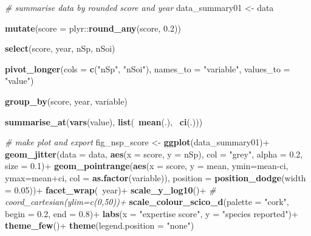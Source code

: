 \documentclass[]{article}
\newenvironment{Shaded}{}{}
\newcommand{\CommentTok}[1]{\textcolor[rgb]{0.38,0.63,0.69}{\textit{#1}}}
\newcommand{\DataTypeTok}[1]{\textcolor[rgb]{0.56,0.13,0.00}{#1}}
\newcommand{\FloatTok}[1]{\textcolor[rgb]{0.25,0.63,0.44}{#1}}
\newcommand{\KeywordTok}[1]{\textcolor[rgb]{0.00,0.44,0.13}{\textbf{#1}}}
\newcommand{\NormalTok}[1]{#1}
\newcommand{\OperatorTok}[1]{\textcolor[rgb]{0.40,0.40,0.40}{#1}}
\newcommand{\StringTok}[1]{\textcolor[rgb]{0.25,0.44,0.63}{#1}}
\begin{document}
\begin{Shaded}
\begin{Highlighting}[]
\CommentTok{# summarise data by rounded score and year}
\NormalTok{data_summary01 <-}\StringTok{ }\NormalTok{data }\OperatorTok{%
\StringTok{  }\KeywordTok{mutate}\NormalTok{(}\DataTypeTok{score =}\NormalTok{ plyr}\OperatorTok{::}\KeywordTok{round_any}\NormalTok{(score, }\FloatTok{0.2}\NormalTok{)) }\OperatorTok{%
\StringTok{  }\KeywordTok{select}\NormalTok{(score, year, nSp, nSoi) }\OperatorTok{%
\StringTok{  }\KeywordTok{pivot_longer}\NormalTok{(}\DataTypeTok{cols =} \KeywordTok{c}\NormalTok{(}\StringTok{"nSp"}\NormalTok{, }\StringTok{"nSoi"}\NormalTok{),}
               \DataTypeTok{names_to =} \StringTok{"variable"}\NormalTok{, }\DataTypeTok{values_to =} \StringTok{"value"}\NormalTok{) }\OperatorTok{%
\StringTok{  }\KeywordTok{group_by}\NormalTok{(score, year, variable) }\OperatorTok{%
\StringTok{  }\KeywordTok{summarise_at}\NormalTok{(}\KeywordTok{vars}\NormalTok{(value), }\KeywordTok{list}\NormalTok{(}\OperatorTok{~}\KeywordTok{mean}\NormalTok{(.), }\OperatorTok{~}\KeywordTok{ci}\NormalTok{(.)))}

\CommentTok{# make plot and export}
\NormalTok{fig_nsp_score <-}\StringTok{ }
\StringTok{  }\KeywordTok{ggplot}\NormalTok{(data_summary01)}\OperatorTok{+}
\StringTok{  }\KeywordTok{geom_jitter}\NormalTok{(}\DataTypeTok{data =}\NormalTok{ data, }\KeywordTok{aes}\NormalTok{(}\DataTypeTok{x =}\NormalTok{ score, }\DataTypeTok{y =}\NormalTok{ nSp), }
             \DataTypeTok{col =} \StringTok{"grey"}\NormalTok{, }\DataTypeTok{alpha =} \FloatTok{0.2}\NormalTok{, }\DataTypeTok{size =} \FloatTok{0.1}\NormalTok{)}\OperatorTok{+}
\StringTok{  }\KeywordTok{geom_pointrange}\NormalTok{(}\KeywordTok{aes}\NormalTok{(}\DataTypeTok{x =}\NormalTok{ score, }\DataTypeTok{y =}\NormalTok{ mean, }
                      \DataTypeTok{ymin=}\NormalTok{mean}\OperatorTok{-}\NormalTok{ci, }\DataTypeTok{ymax=}\NormalTok{mean}\OperatorTok{+}\NormalTok{ci,}
                      \DataTypeTok{col =} \KeywordTok{as.factor}\NormalTok{(variable)),}
                  \DataTypeTok{position =} \KeywordTok{position_dodge}\NormalTok{(}\DataTypeTok{width =} \FloatTok{0.05}\NormalTok{))}\OperatorTok{+}
\StringTok{  }\KeywordTok{facet_wrap}\NormalTok{(}\OperatorTok{~}\NormalTok{year)}\OperatorTok{+}
\StringTok{  }\KeywordTok{scale_y_log10}\NormalTok{()}\OperatorTok{+}
\CommentTok{#  coord_cartesian(ylim=c(0,50))+}
\StringTok{  }\KeywordTok{scale_colour_scico_d}\NormalTok{(}\DataTypeTok{palette =} \StringTok{"cork"}\NormalTok{, }\DataTypeTok{begin =} \FloatTok{0.2}\NormalTok{, }\DataTypeTok{end =} \FloatTok{0.8}\NormalTok{)}\OperatorTok{+}
\StringTok{  }\KeywordTok{labs}\NormalTok{(}\DataTypeTok{x =} \StringTok{"expertise score"}\NormalTok{, }\DataTypeTok{y =} \StringTok{"species reported"}\NormalTok{)}\OperatorTok{+}
\StringTok{  }\KeywordTok{theme_few}\NormalTok{()}\OperatorTok{+}
\StringTok{  }\KeywordTok{theme}\NormalTok{(}\DataTypeTok{legend.position =} \StringTok{"none"}\NormalTok{)}

}}}}}
\end{Highlighting}
\end{Shaded}
\end{document}
